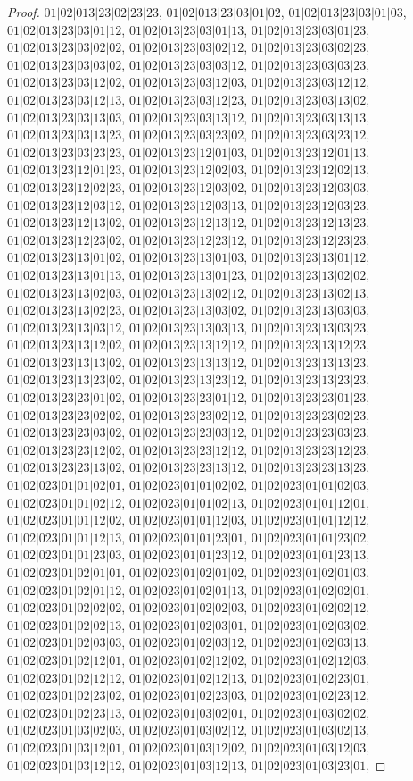 \documentclass[12pt]{article}
\theoremstyle{plain}
\theoremstyle{definition}
\theoremstyle{remark}
\begin{document}
\begin{proof}
$01|02|013|23|02|23|23$, $01|02|013|23|03|01|02$, $01|02|013|23|03|01|03$, $01|02|013|23|03|01|12$, $01|02|013|23|03|01|13$, $01|02|013|23|03|01|23$, $01|02|013|23|03|02|02$, $01|02|013|23|03|02|12$, $01|02|013|23|03|02|23$, $01|02|013|23|03|03|02$, $01|02|013|23|03|03|12$, $01|02|013|23|03|03|23$, $01|02|013|23|03|12|02$, $01|02|013|23|03|12|03$, $01|02|013|23|03|12|12$, $01|02|013|23|03|12|13$, $01|02|013|23|03|12|23$, $01|02|013|23|03|13|02$, $01|02|013|23|03|13|03$, $01|02|013|23|03|13|12$, $01|02|013|23|03|13|13$, $01|02|013|23|03|13|23$, $01|02|013|23|03|23|02$, $01|02|013|23|03|23|12$, $01|02|013|23|03|23|23$, $01|02|013|23|12|01|03$, $01|02|013|23|12|01|13$, $01|02|013|23|12|01|23$, $01|02|013|23|12|02|03$, $01|02|013|23|12|02|13$, $01|02|013|23|12|02|23$, $01|02|013|23|12|03|02$, $01|02|013|23|12|03|03$, $01|02|013|23|12|03|12$, $01|02|013|23|12|03|13$, $01|02|013|23|12|03|23$, $01|02|013|23|12|13|02$, $01|02|013|23|12|13|12$, $01|02|013|23|12|13|23$, $01|02|013|23|12|23|02$, $01|02|013|23|12|23|12$, $01|02|013|23|12|23|23$, $01|02|013|23|13|01|02$, $01|02|013|23|13|01|03$, $01|02|013|23|13|01|12$, $01|02|013|23|13|01|13$, $01|02|013|23|13|01|23$, $01|02|013|23|13|02|02$, $01|02|013|23|13|02|03$, $01|02|013|23|13|02|12$, $01|02|013|23|13|02|13$, $01|02|013|23|13|02|23$, $01|02|013|23|13|03|02$, $01|02|013|23|13|03|03$, $01|02|013|23|13|03|12$, $01|02|013|23|13|03|13$, $01|02|013|23|13|03|23$, $01|02|013|23|13|12|02$, $01|02|013|23|13|12|12$, $01|02|013|23|13|12|23$, $01|02|013|23|13|13|02$, $01|02|013|23|13|13|12$, $01|02|013|23|13|13|23$, $01|02|013|23|13|23|02$, $01|02|013|23|13|23|12$, $01|02|013|23|13|23|23$, $01|02|013|23|23|01|02$, $01|02|013|23|23|01|12$, $01|02|013|23|23|01|23$, $01|02|013|23|23|02|02$, $01|02|013|23|23|02|12$, $01|02|013|23|23|02|23$, $01|02|013|23|23|03|02$, $01|02|013|23|23|03|12$, $01|02|013|23|23|03|23$, $01|02|013|23|23|12|02$, $01|02|013|23|23|12|12$, $01|02|013|23|23|12|23$, $01|02|013|23|23|13|02$, $01|02|013|23|23|13|12$, $01|02|013|23|23|13|23$, $01|02|023|01|01|02|01$, $01|02|023|01|01|02|02$, $01|02|023|01|01|02|03$, $01|02|023|01|01|02|12$, $01|02|023|01|01|02|13$, $01|02|023|01|01|12|01$, $01|02|023|01|01|12|02$, $01|02|023|01|01|12|03$, $01|02|023|01|01|12|12$, $01|02|023|01|01|12|13$, $01|02|023|01|01|23|01$, $01|02|023|01|01|23|02$, $01|02|023|01|01|23|03$, $01|02|023|01|01|23|12$, $01|02|023|01|01|23|13$, $01|02|023|01|02|01|01$, $01|02|023|01|02|01|02$, $01|02|023|01|02|01|03$, $01|02|023|01|02|01|12$, $01|02|023|01|02|01|13$, $01|02|023|01|02|02|01$, $01|02|023|01|02|02|02$, $01|02|023|01|02|02|03$, $01|02|023|01|02|02|12$, $01|02|023|01|02|02|13$, $01|02|023|01|02|03|01$, $01|02|023|01|02|03|02$, $01|02|023|01|02|03|03$, $01|02|023|01|02|03|12$, $01|02|023|01|02|03|13$, $01|02|023|01|02|12|01$, $01|02|023|01|02|12|02$, $01|02|023|01|02|12|03$, $01|02|023|01|02|12|12$, $01|02|023|01|02|12|13$, $01|02|023|01|02|23|01$, $01|02|023|01|02|23|02$, $01|02|023|01|02|23|03$, $01|02|023|01|02|23|12$, $01|02|023|01|02|23|13$, $01|02|023|01|03|02|01$, $01|02|023|01|03|02|02$, $01|02|023|01|03|02|03$, $01|02|023|01|03|02|12$, $01|02|023|01|03|02|13$, $01|02|023|01|03|12|01$, $01|02|023|01|03|12|02$, $01|02|023|01|03|12|03$, $01|02|023|01|03|12|12$, $01|02|023|01|03|12|13$, $01|02|023|01|03|23|01$, 
\end{proof}
\end{document}
